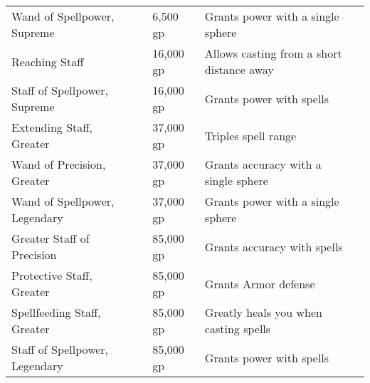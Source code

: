 \begin{longtabuwrapper}
\begin{longtabu}{l l l X l}
Wand of Spellpower, Supreme &  & 6,500 gp & Grants  power with a single sphere & \pageref{item:Wand of Spellpower, Supreme} \\
Reaching Staff &  & 16,000 gp & Allows casting from a short distance away & \pageref{item:Reaching Staff} \\
Staff of Spellpower, Supreme &  & 16,000 gp & Grants  power with spells & \pageref{item:Staff of Spellpower, Supreme} \\
Extending Staff, Greater &  & 37,000 gp & Triples spell range & \pageref{item:Extending Staff, Greater} \\
Wand of Precision, Greater &  & 37,000 gp & Grants  accuracy with a single sphere & \pageref{item:Wand of Precision, Greater} \\
Wand of Spellpower, Legendary &  & 37,000 gp & Grants  power with a single sphere & \pageref{item:Wand of Spellpower, Legendary} \\
Greater Staff of Precision &  & 85,000 gp & Grants  accuracy with spells & \pageref{item:Greater Staff of Precision} \\
Protective Staff, Greater &  & 85,000 gp & Grants  Armor defense & \pageref{item:Protective Staff, Greater} \\
Spellfeeding Staff, Greater &  & 85,000 gp & Greatly heals you when casting spells & \pageref{item:Spellfeeding Staff, Greater} \\
Staff of Spellpower, Legendary &  & 85,000 gp & Grants  power with spells & \pageref{item:Staff of Spellpower, Legendary} \\
\end{longtabu}
\end{longtabuwrapper}
